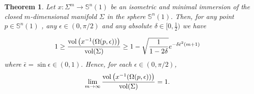 \documentclass{amsart}
\newtheorem{theorem}{Theorem}[section]
\theoremstyle{definition}
\theoremstyle{remark}
\begin{document}
\begin{theorem}\label{mainInt}
Let  $x: \Sigma^m \to \mathbb{S}^n(1)$ be an isometric and minimal immersion of the closed $m$-dimensional manifold $\Sigma$ in the sphere  $\mathbb{S}^n(1)$. Then, for any point $p \in \mathbb{S}^n(1)$ , any  $\epsilon \in (0,\pi/2)$ and any  absolute $\delta\in [0,\frac{1}{2})$ we have 

\begin{equation}\label{eq4}
1\geq \frac{{\rm vol}\left(x^{-1}(\Omega(p,\epsilon))\right)}{{\rm vol}(\Sigma)}\geq  1- \sqrt{\frac{1}{1-2\delta}}e^{-\delta\bar\epsilon^2(m+1)}
\end{equation}
where $\bar\epsilon=\sin\epsilon \in (0,1)$. Hence, for each  $\epsilon \in (0,\pi/2)$,
\begin{equation}\label{eq5}
\lim_{m\to\infty}\frac{{\rm vol}\left(x^{-1}(\Omega(p,\epsilon))\right)}{{\rm vol}(\Sigma)}=1.
\end{equation}


\end{theorem}
\end{document}
